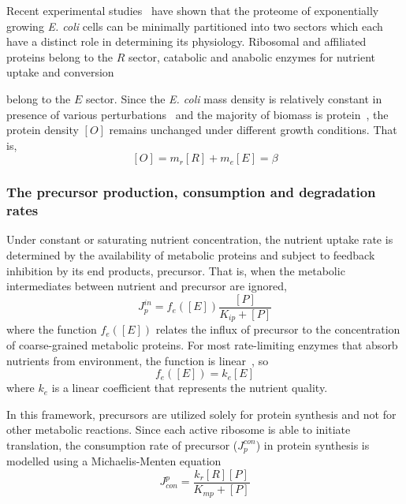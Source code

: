 \documentclass[11pt]{article}
\begin{document}
{\color{black}Recent} experimental {\color{black}studies}~\cite{scott2010interdependence,hui2015quantitative} have shown that the proteome of exponentially growing \textit{E. coli} cells can be minimally partitioned into two sectors {\color{black}which each have a distinct role in determining its physiology.} Ribosomal and affiliated proteins {\color{black}belong to the $R$ sector,} catabolic and anabolic enzymes for nutrient uptake and conversion {\color{black}belong to the $E$ sector. Since the \textit{E. coli} mass density is relatively constant in presence of various perturbations~\cite{kubitschek1984independence,basan2015inflating} and the majority of biomass is protein~\cite{bremer2008modulation}, the protein density $[O]$ remains unchanged under different growth conditions. {\color{black}That is,}
\begin{equation}\label{eq:proteome_conservation_REonly}
[O]=m_r[R]+m_e[E] =  \beta
\end{equation}

\subsubsection{The precursor production, consumption and degradation rates}
\label{sect_the_amino_acid_production_consumption_and_degradation_rate}

Under constant or saturating nutrient concentration, the nutrient uptake rate is determined by the availability of metabolic proteins and subject to feedback inhibition by {\color{black}its} end products, {\color{black} precursor. That is, when the metabolic intermediates between nutrient and precursor are ignored,}
\begin{equation}\label{eq:Ja_in_general_equation}
J_p^{in} = f_e([E])\dfrac{[P]}{K_{ip}+[P]}
\end{equation}
where the function $f_e([E])$ {\color{black}relates the influx of precursor to the concentration of coarse-grained metabolic proteins.} For most rate-limiting enzymes that absorb nutrients from environment, the function is linear~\cite{aidelberg2014hierarchy}, {\color{black}so}
\begin{equation}\label{eq:fe_lin}
f_e([E]) = k_e[E]
\end{equation}
where $k_e$ {\color{black}is a linear coefficient that} represents the nutrient quality.

{\color{black}In this framework, }precursors {\color{black}are utilized solely for} protein synthesis {\color{black}and not for} other metabolic reactions. Since each active ribosome is able to initiate translation, the consumption rate of precursor ($J_p^{con}$) in protein synthesis is modelled using a Michaelis-Menten equation
\begin{equation}
J_{con}^p = \frac{k_{r}[R][P]}{K_{mp}+[P]}
\end{equation}

}
\end{document}
